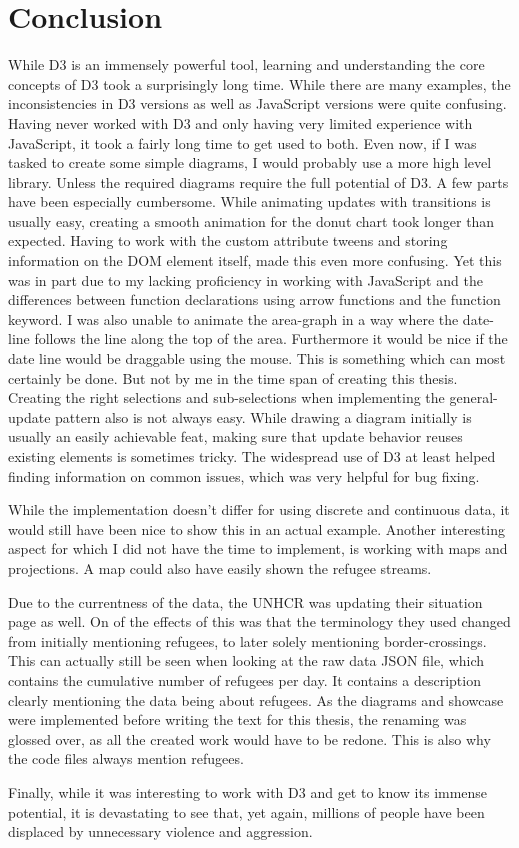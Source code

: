 \chapter{Conclusion}

While D3 is an immensely powerful tool, learning and understanding the core concepts of D3 took a surprisingly long time. While there are many examples, the inconsistencies in D3 versions as well as JavaScript versions were quite confusing. Having never worked with D3 and only having very limited experience with JavaScript, it took a fairly long time to get used to both.
Even now, if I was tasked to create some simple diagrams, I would probably use a more high level library. Unless the required diagrams require the full potential of D3.
A few parts have been especially cumbersome. While animating updates with transitions is usually easy, creating a smooth animation for the donut chart took longer than expected. Having to work with the custom attribute tweens and storing information on the DOM element itself, made this even more confusing. Yet this was in part due to my lacking proficiency in working with JavaScript and the differences between function declarations using arrow functions and the function keyword. I was also unable to animate the area-graph in a way where the date-line follows the line along the top of the area. Furthermore it would be nice if the date line would be draggable using the mouse. This is something which can most certainly be done. But not by me in the time span of creating this thesis. Creating the right selections and sub-selections when implementing the general-update pattern also is not always easy. While drawing a diagram initially is usually an easily achievable feat, making sure that update behavior reuses existing elements is sometimes tricky. The widespread use of D3 at least helped finding information on common issues, which was very helpful for bug fixing.

While the implementation doesn't differ for using discrete and continuous data, it would still have been nice to show this in an actual example. Another interesting aspect for which I did not have the time to implement, is working with maps and projections. A map could also have easily shown the refugee streams.

Due to the currentness of the data, the UNHCR was updating their situation page as well. On of the effects of this was that the terminology they used changed from initially mentioning refugees, to later solely mentioning border-crossings. This can actually still be seen when looking at the raw data JSON file, which contains the cumulative number of refugees per day. It contains a description clearly mentioning the data being about refugees. As the diagrams and showcase were implemented before writing the text for this thesis, the renaming was glossed over, as all the created work would have to be redone. This is also why the code files always mention refugees. 

Finally, while it was interesting to work with D3 and get to know its immense potential, it is devastating to see that, yet again, millions of people have been displaced by unnecessary violence and aggression.
